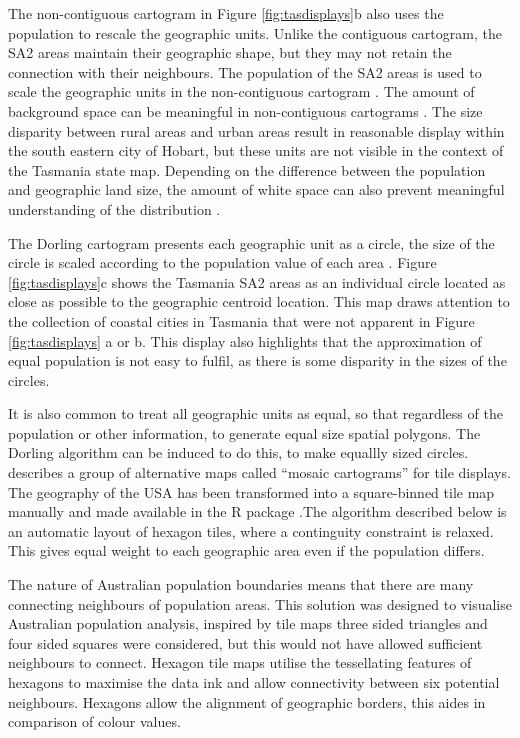 The non-contiguous cartogram in Figure \ref{fig:tasdisplays}b also uses
the population to rescale the geographic units. Unlike the contiguous
cartogram, the SA2 areas maintain their geographic shape, but they may
not retain the connection with their neighbours. The population of the
SA2 areas is used to scale the geographic units in the non-contiguous
cartogram \citep{NAC}. The amount of background space can be meaningful
in non-contiguous cartograms \citep{ECGC}. The size disparity between
rural areas and urban areas result in reasonable display within the
south eastern city of Hobart, but these units are not visible in the
context of the Tasmania state map. Depending on the difference between
the population and geographic land size, the amount of white space can
also prevent meaningful understanding of the distribution \citep{TVSSS}.

The Dorling cartogram presents each geographic unit as a circle, the
size of the circle is scaled according to the population value of each
area \citep{ACTUC}. Figure \ref{fig:tasdisplays}c shows the Tasmania SA2
areas as an individual circle located as close as possible to the
geographic centroid location. This map draws attention to the collection
of coastal cities in Tasmania that were not apparent in Figure
\ref{fig:tasdisplays} a or b. This display also highlights that the
approximation of equal population is not easy to fulfil, as there is
some disparity in the sizes of the circles.

It is also common to treat all geographic units as equal, so that
regardless of the population or other information, to generate equal
size spatial polygons. The Dorling algorithm can be induced to do this,
to make equallly sized circles. \citet{MDAC} describes a group of
alternative maps called ``mosaic cartograms'' for tile displays. The
geography of the USA has been transformed into a square-binned tile map
manually and made available in the R package 
\citep{statebins}.The algorithm described below is an automatic layout
of hexagon tiles, where a continguity constraint is relaxed. This gives
equal weight to each geographic area even if the population differs.

The nature of Australian population boundaries means that there are many
connecting neighbours of population areas. This solution was designed to
visualise Australian population analysis, inspired by tile maps three
sided triangles and four sided squares were considered, but this would
not have allowed sufficient neighbours to connect. Hexagon tile maps
utilise the tessellating features of hexagons to maximise the data ink
and allow connectivity between six potential neighbours. Hexagons allow
the alignment of geographic borders, this aides in comparison of colour
values.

